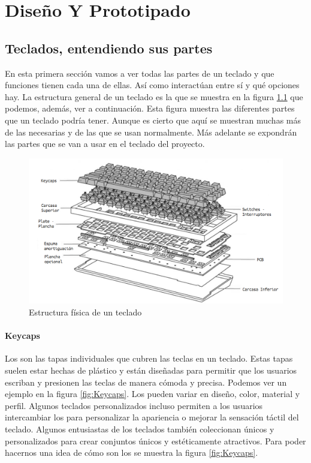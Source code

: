 \chapter{Diseño Y Prototipado} \label{CapDiseño}

\section{Teclados, entendiendo sus partes}

En esta primera sección vamos a ver todas las partes de un teclado y que funciones tienen cada una de ellas. Así como interactúan entre sí y qué opciones hay. \cite{TearDownImageSource} La estructura general de un teclado es la que se muestra en la figura \ref{fig:TearDown} que podemos, además, ver a continuación. Esta figura muestra las diferentes partes que un teclado podría tener. Aunque es cierto que aquí se muestran muchas más de las necesarias y de las que se usan normalmente. Más adelante se expondrán las partes que se van a usar en el teclado del proyecto.

\begin{figure}[H]
    \centering
    \includegraphics[width=1\textwidth]{imagenes/Capitulos/Cap03/KeyboardTeardown.png}
    \caption{Estructura física de un teclado \cite{TearDownImageSource}}
    \label{fig:TearDown}
\end{figure}



\subsubsection{\gls{Keycaps}}

Los  son las tapas individuales que cubren las teclas en un teclado. Estas tapas suelen estar hechas de plástico y están diseñadas para permitir que los usuarios escriban y presionen las teclas de manera cómoda y precisa. Podemos ver un ejemplo en la figura \ref{fig:Keycaps}. Los  pueden variar en diseño, color, material y perfil. Algunos teclados personalizados incluso permiten a los usuarios intercambiar los  para personalizar la apariencia o mejorar la sensación táctil del teclado. Algunos entusiastas de los teclados también coleccionan  únicos y personalizados para crear conjuntos únicos y estéticamente atractivos. Para poder hacernos una idea de cómo son los  se muestra la figura \ref{fig:Keycaps}.

